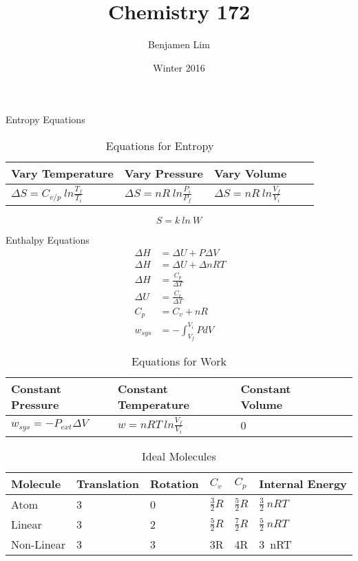 \documentclass{article}
\title{Chemistry 172}
\author{Benjamen Lim}
\date{Winter 2016}
\begin{document}
\maketitle

Entropy Equations

\begin{table}[h]
\centering
\caption{Equations for Entropy}
\label{my-label}
\def\arraystretch{1.5}
\begin{tabular}{|l|l|l|l|l|}
\hline
Vary Temperature & Vary Pressure   & Vary Volume   \\
\hline
$\Delta S = C_{v/p}\ ln \frac{T_f}{T_i}$   & $\Delta S = nR\ ln \frac{P_i}{P_f}$ & $\Delta S = nR\ ln \frac{V_f}{V_i}$ \\
\hline
\end{tabular}
\end{table}

\begin{equation*}
S = k\ ln\ W
\end{equation*}



Enthalpy Equations\\
\begin{equation*}
\begin{split}
\
\Delta H &= \Delta U + P \Delta V \\ 
\
\Delta H &= \Delta U + \Delta n RT\\
\
\Delta H &= \frac{C_p}{\Delta T}\\
\
\Delta U &= \frac{C_v}{\Delta T}\\
\
C_p &= C_v + nR\\
\
w_{sys} & = - \int_{V_f}^{V_i} P dV
\end{split}
\end{equation*}

\begin{table}[h]
\centering
\caption{Equations for Work}
\label{my-label}
\def\arraystretch{1.5}
\begin{tabular}{|l|l|l|l|l|}
\hline
Constant Pressure & Constant Temperature & Constant Volume   \\
\hline
$w_{sys} = - P_{ext} \Delta V$   & $w = n R T\ ln \frac{V_f}{V_i}$ & 0 \\
\hline
\end{tabular}
\end{table}

\begin{table}[h]
\centering
\caption{Ideal Molecules}
\label{my-label}
\def\arraystretch{1.5}
\begin{tabular}{|l|l|l|l|l|l|}
\hline
Molecule & Translation & Rotation & $C_v$ & $C_p$ & Internal Energy  \\
\hline
Atom & 3 & 0 & $\frac{3}{2}R$ & $\frac{5}{2}R$ & $\frac{3}{2}\ nRT$\\
\hline
Linear & 3 & 2 & $\frac{5}{2}R$& $\frac{7}{2}R$ & $\frac{5}{2}\ nRT$\\
\hline
Non-Linear & 3 & 3 & 3R & 4R & 3\ nRT\\
\hline
\end{tabular}
\end{table}
\end{document}
